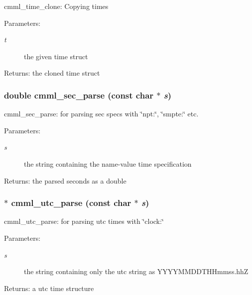 cmml\_\-time\_\-clone: Copying times

\begin{Desc}
\item[Parameters:]
\begin{description}
\item[{\em t}]the given time struct\end{description}
\end{Desc}
\begin{Desc}
\item[Returns:]the cloned time struct \end{Desc}
\subsubsection{\setlength{\rightskip}{0pt plus 5cm}double cmml\_\-sec\_\-parse (const char $\ast$ {\em s})}\label{cmml_8h_a105}


cmml\_\-sec\_\-parse: for parsing sec specs with \char`\"{}npt:\char`\"{}, \char`\"{}smpte:\char`\"{} etc.

\begin{Desc}
\item[Parameters:]
\begin{description}
\item[{\em s}]the string containing the name-value time specification\end{description}
\end{Desc}
\begin{Desc}
\item[Returns:]the parsed seconds as a double \end{Desc}
\subsubsection{$\ast$ cmml\_\-utc\_\-parse (const char $\ast$ {\em s})}\label{cmml_8h_a106}


cmml\_\-utc\_\-parse: for parsing utc times with \char`\"{}clock:\char`\"{}

\begin{Desc}
\item[Parameters:]
\begin{description}
\item[{\em s}]the string containing only the utc string as YYYYMMDDTHHmmss.hh\-Z\end{description}
\end{Desc}
\begin{Desc}
\item[Returns:]a utc time structure \end{Desc}
